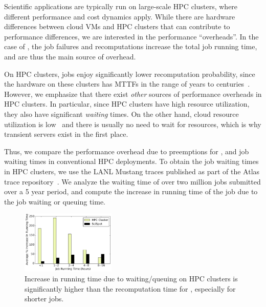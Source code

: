 Scientific applications are typically run on large-scale HPC clusters, where different performance and cost dynamics apply.
While there are hardware differences between cloud VMs and HPC clusters that can contribute to performance differences, we are interested in the performance ``overheads''.
In the case of \sysname, the job failures and recomputations increase the total job running time, and are thus the main source of overhead.

On HPC clusters, jobs enjoy significantly lower recomputation probability, since the hardware on these clusters has MTTFs in the range of years to centuries~\cite{dongarra-ckpting}.
However, we emphasize that there exist \emph{other} sources of performance overheads in HPC clusters.
In particular, since HPC clusters have high resource utilization, they also have significant \emph{waiting} times. 
On the other hand, cloud resource utilization is low~\cite{borg} and there is usually no need to wait for resources, which is why transient servers exist in the first place. 


Thus, we compare the performance overhead due to preemptions for \sysname, and job waiting times in conventional HPC deployments.
To obtain the job waiting times in HPC clusters, we use the LANL Mustang traces published as part of the Atlas trace repository~\cite{cmu-atlas}.
We analyze the waiting time of over two million jobs submitted over a 5 year period, and compute the increase in running time of the job due to the job waiting or queuing time. 

\begin{figure}[t]
  \centering 
  \includegraphics[width=0.4\textwidth]{../graphs/hpc-vs-scispot.pdf}
      \vspace*{\myfigspace}
  \caption{Increase in running time due to waiting/queuing on HPC clusters is significantly higher than the recomputation time for \sysname, especially for shorter jobs. }
  \label{fig:hpc-vs-scispot}
  \vspace*{\myfigspace}
\end{figure}


